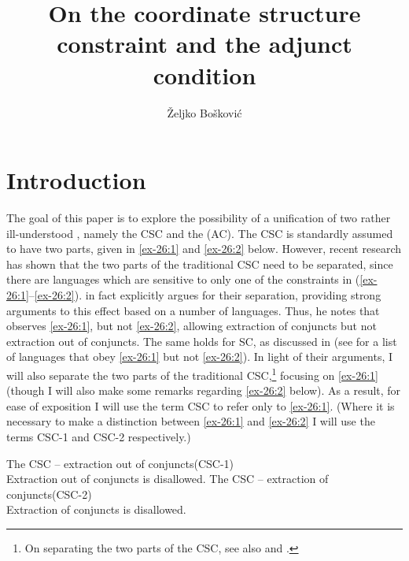 \documentclass[output=paper]{langsci/langscibook}
\author{Željko Bošković\affiliation{University of Connecticut}}
\title{On the coordinate structure constraint and the adjunct condition}
\begin{document}
\glsresetall


\section{Introduction}\label{sec:35.1}

The goal of this paper is to explore the possibility of a unification of two
rather ill-understood , namely the \gls{CSC} and the  (AC). The \gls{CSC} is standardly assumed to have two parts, given in \eqref{ex-26:1} and
\eqref{ex-26:2} below.  However, recent research has shown that the two parts of the
traditional \gls{CSC} need to be separated,
since there are languages which are sensitive to only one of the constraints in
(\ref{ex-26:1}--\ref{ex-26:2}). \textcite{Oda:2017} in fact explicitly argues for their separation,
providing strong arguments to this effect based on a number of languages. Thus,
he notes that  observes \eqref{ex-26:1}, but not \eqref{ex-26:2}, allowing extraction of
conjuncts but not extraction out of conjuncts. The same holds for \gls{SC}, as
discussed in \textcite{Stjepanovic2014} (see \citealt{Oda:2017} for a list of
languages that obey \eqref{ex-26:1} but not \eqref{ex-26:2}). In light of their arguments, I will also
separate the two parts of the traditional \gls{CSC},\footnote{On separating the two parts of the
\gls{CSC}, see also \citet{Grosu1973} and
\citet{Postal1998}.} focusing on \eqref{ex-26:1} (though I will also make some remarks
regarding \eqref{ex-26:2} below).  As a result, for ease of exposition I will use the term
\gls{CSC} to refer only to \eqref{ex-26:1}. (Where it
is necessary to make a distinction between \eqref{ex-26:1} and \eqref{ex-26:2} I will use the terms
CSC-1 and CSC-2 respectively.)

\ea\label{ex-26:1}The \glsdesc{CSC} -- extraction out of conjuncts\hfill\hbox{(CSC-1)}\\
	Extraction out of conjuncts is disallowed.
\ex\label{ex-26:2}The \glsdesc{CSC} – extraction of conjuncts\hfill\hbox{(CSC-2)}\\
	Extraction of conjuncts is disallowed.
\z
\end{document}
